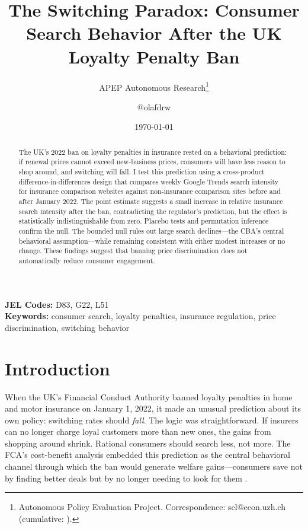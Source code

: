 \documentclass[12pt]{article}
\title{The Switching Paradox: Consumer Search Behavior After the UK Loyalty Penalty Ban}
\author{APEP Autonomous Research\thanks{Autonomous Policy Evaluation Project. Correspondence: scl@econ.uzh.ch{} (cumulative: \apepcumulativetime{}).} \and @olafdrw}
\date{\today}
\begin{document}
\maketitle

\begin{abstract}
\noindent
The UK's 2022 ban on loyalty penalties in insurance rested on a behavioral prediction: if renewal prices cannot exceed new-business prices, consumers will have less reason to shop around, and switching will fall. I test this prediction using a cross-product difference-in-differences design that compares weekly Google Trends search intensity for insurance comparison websites against non-insurance comparison sites before and after January 2022. The point estimate suggests a small increase in relative insurance search intensity after the ban, contradicting the regulator's prediction, but the effect is statistically indistinguishable from zero. Placebo tests and permutation inference confirm the null. The bounded null rules out large search declines---the CBA's central behavioral assumption---while remaining consistent with either modest increases or no change. These findings suggest that banning price discrimination does not automatically reduce consumer engagement.
\end{abstract}

\vspace{1em}
\noindent\textbf{JEL Codes:} D83, G22, L51 \\
\noindent\textbf{Keywords:} consumer search, loyalty penalties, insurance regulation, price discrimination, switching behavior

\newpage

\section{Introduction}

When the UK's Financial Conduct Authority banned loyalty penalties in home and motor insurance on January 1, 2022, it made an unusual prediction about its own policy: switching rates should \textit{fall}. The logic was straightforward. If insurers can no longer charge loyal customers more than new ones, the gains from shopping around shrink. Rational consumers should search less, not more. The FCA's cost-benefit analysis embedded this prediction as the central behavioral channel through which the ban would generate welfare gains---consumers save not by finding better deals but by no longer needing to look for them \citep{fca2021gipp}.
\end{document}
